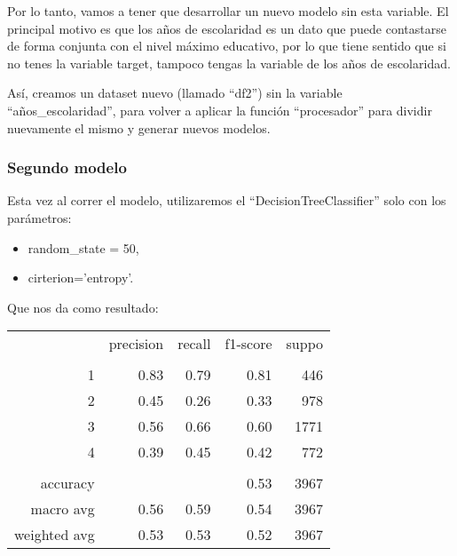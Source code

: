 \documentclass[a4paper]{article}
\begin{document}
            Por lo tanto, vamos a tener que desarrollar un nuevo modelo sin esta variable. El principal motivo es que los años de escolaridad es un dato que puede contastarse de forma conjunta con el nivel máximo educativo, por lo que tiene sentido que si no tenes la variable target, tampoco tengas la variable de los años de escolaridad.

            Así, creamos un dataset nuevo (llamado ``df2'') sin la variable ``años\_escolaridad'', para volver a aplicar la función ``procesador'' para dividir nuevamente el mismo y generar nuevos modelos.

        \subsubsection{Segundo modelo}

            Esta vez al correr el modelo, utilizaremos el ``DecisionTreeClassifier'' solo con los parámetros:
            \begin{itemize}
                \item random\_state = 50,
                \item cirterion='entropy'.
            \end{itemize}
            Que nos da como resultado:  

            \begin{table}[!ht]
                \centering
                \begin{tabular}{rrrrr}
                    ~ & precision & recall & f1-score & suppo \\
                    & & & & \\
                    1 & 0.83 & 0.79 & 0.81 & 446 \\
                    2 & 0.45 & 0.26 & 0.33 & 978 \\
                    3 & 0.56 & 0.66 & 0.60 & 1771 \\
                    4 & 0.39 & 0.45 & 0.42 & 772 \\
                    & & & & \\
                    accuracy & & & 0.53 & 3967 \\
                    macro avg & 0.56 & 0.59 & 0.54 & 3967 \\
                    weighted avg & 0.53 & 0.53 & 0.52 & 3967 \\
                \end{tabular}
            \end{table}
\end{document}
